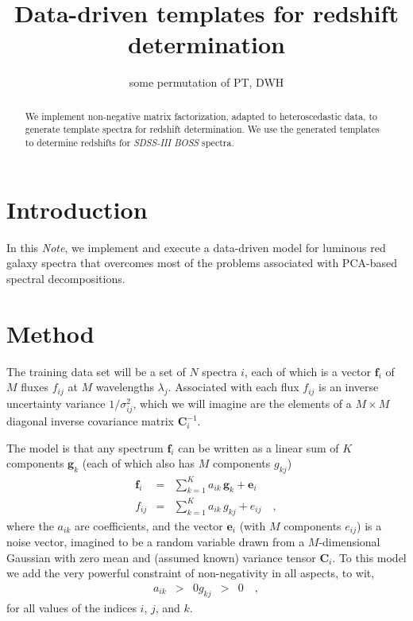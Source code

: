 \documentclass[preprint]{aastex}
\newcounter{address}
\newcommand{\project}[1]{\textsl{#1}}
\newcommand{\mmatrix}[1]{\boldsymbol{#1}}
\newcommand{\inverse}[1]{{#1}^{-1}}
\newcommand{\covar}{\mmatrix{C}}
\newcommand{\evec}{\mmatrix{e}}
\newcommand{\fvec}{\mmatrix{f}}
\newcommand{\gvec}{\mmatrix{g}}
\newcommand{\invvar}{\inverse{\covar}}
\newcommand{\documentname}{\textsl{Note}}
\begin{document}
\title{Data-driven templates for redshift determination}
\author{some permutation of PT\altaffilmark{\ref{MPIA}},
        DWH\altaffilmark{\ref{MPIA},\ref{CCPP}}}
\setcounter{address}{1}

\begin{abstract}
  We implement non-negative matrix factorization, adapted to
  heteroscedastic data, to generate template spectra for redshift
  determination.  We use the generated templates to determine
  redshifts for \project{SDSS-III} \project{BOSS} spectra.
\end{abstract}

\section{Introduction}

In this \documentname, we implement and execute a data-driven model
for luminous red galaxy spectra that overcomes most of the problems
associated with PCA-based spectral decompositions.

\section{Method}

The training data set will be a set of $N$ spectra $i$, each of which
is a vector $\fvec_i$ of $M$ fluxes $f_{ij}$ at $M$ wavelengths
$\lambda_j$.  Associated with each flux $f_{ij}$ is an inverse
uncertainty variance $1/\sigma^2_{ij}$, which we will imagine are the
elements of a $M\times M$ diagonal inverse covariance matrix
$\invvar_{i}$.

The model is that any spectrum $\fvec_i$ can be written as a linear
sum of $K$ components $\gvec_k$ (each of which also has $M$ components
$g_{kj}$)
\begin{eqnarray}\displaystyle
\fvec_i &=& \sum_{k=1}^K a_{ik}\,\gvec_k + \evec_i \nonumber\\
f_{ij} &=& \sum_{k=1}^K a_{ik}\,g_{kj} + e_{ij}
\quad,
\end{eqnarray}
where the $a_{ik}$ are coefficients, and the vector $\evec_i$ (with
$M$ components $e_{ij}$) is a noise vector, imagined to be a random
variable drawn from a $M$-dimensional Gaussian with zero mean and
(assumed known) variance tensor $\covar_i$.  To this model we add the
very powerful constraint of non-negativity in all aspects, to wit,
\begin{eqnarray}\displaystyle
a_{ik} &>& 0
g_{kj} &>& 0
\quad,
\end{eqnarray}
for all values of the indices $i$, $j$, and $k$.
\end{document}
